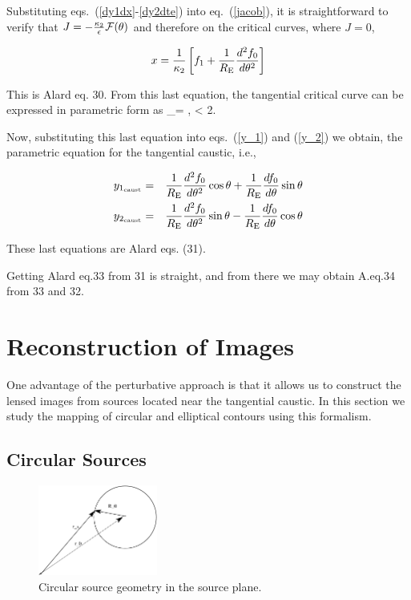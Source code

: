 Substituting eqs.~(\ref{dy1dx}-\ref{dy2dte}) into eq.~(\ref{jacob}),
it is straightforward to verify that $J=-{\kappa_2 \over \epsilon}
\mathcal{F}(\theta)$ and therefore on the critical curves, where $J = 0$,

\begin{equation}
\label{eq:critcurves}
x=\frac{1}{\kappa_2}\left[f_1+\frac{1}{R_{\mathrm{E}}}\frac{d^2f_0}{d\theta^2}\right]
\end{equation}

This is Alard eq. 30. From this last equation, the tangential critical
curve can be expressed in parametric form as \beq
{}_{}= , \leq \te < 2\pi.  \eeq

Now, substituting this last equation into eqs.~(\ref{y_1}) and
(\ref{y_2}) we obtain, the parametric equation for the tangential
caustic, i.e.,

\begin{eqnarray}
\label{eq:xcaustic}
y_{1_\mathrm{caust}} &=& \frac{1}{R_{\mathrm{E}}}\frac{d^2f_0}{d\theta^2}\cos{\theta}+\frac{1}{R_{\mathrm{E}}}\frac{df_0}{d\theta}\sin{\theta}\\
\label{eq:ycaustic}
y_{2_\mathrm{caust}} &=& \frac{1}{R_{\mathrm{E}}}\frac{d^2f_0}{d\theta^2}\sin{\theta}-\frac{1}{R_{\mathrm{E}}}\frac{df_0}{d\theta}\cos{\theta}
\end{eqnarray}

These last equations are Alard eqs. (31).


Getting Alard eq.33 from 31 is straight, and from there we may obtain
A.eq.34 from 33 and 32.

\section{Reconstruction of Images}

One advantage of the perturbative approach is that it allows us to
construct the lensed images from sources located near the
tangential caustic.  In this section we study the mapping of 
circular and elliptical contours using this formalism.

\subsection{Circular Sources}

\begin{figure}
  \begin{center}
   \includegraphics[width=0.35\textwidth]{graphics/sourceplane.pdf}
  \end{center}
    \caption{\label{fig:circular_source}Circular source geometry in the source plane.}
\end{figure}

